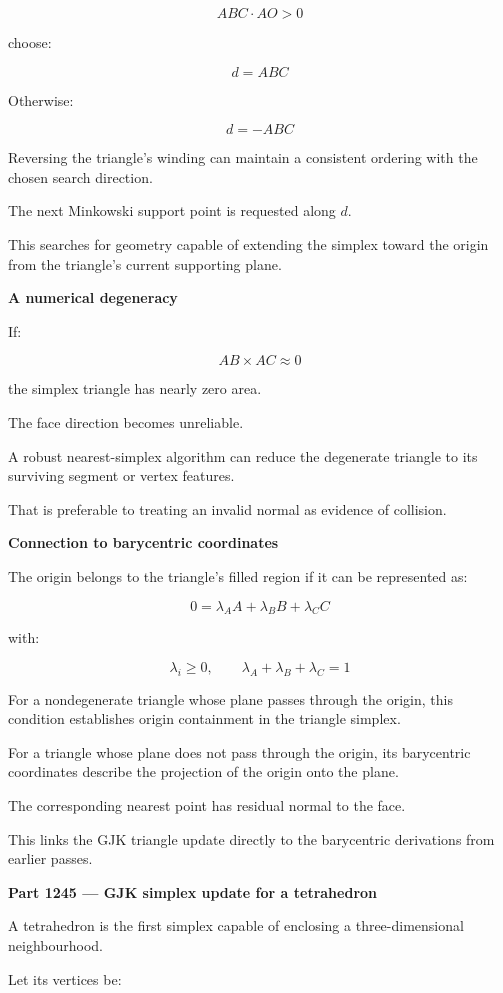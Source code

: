 \[
ABC\cdot AO>0
\]

choose:

\[
\boxed{d=ABC}
\]

Otherwise:

\[
\boxed{d=-ABC}
\]

Reversing the triangle's winding can maintain a consistent ordering with the chosen search direction.

The next Minkowski support point is requested along \(d\).

This searches for geometry capable of extending the simplex toward the origin from the triangle's current supporting plane.

\textbf{A numerical degeneracy}

If:

\[
AB\times AC\approx0
\]

the simplex triangle has nearly zero area.

The face direction becomes unreliable.

A robust nearest-simplex algorithm can reduce the degenerate triangle to its surviving segment or vertex features.

That is preferable to treating an invalid normal as evidence of collision.

\textbf{Connection to barycentric coordinates}

The origin belongs to the triangle's filled region if it can be represented as:

\[
0=\lambda_AA+\lambda_BB+\lambda_CC
\]

with:

\[
\lambda_i\ge0,\qquad \lambda_A+\lambda_B+\lambda_C=1
\]

For a nondegenerate triangle whose plane passes through the origin, this condition establishes origin containment in the triangle simplex.

For a triangle whose plane does not pass through the origin, its barycentric coordinates describe the projection of the origin onto the plane.

The corresponding nearest point has residual normal to the face.

This links the GJK triangle update directly to the barycentric derivations from earlier passes.

\textbf{Part 1245 --- GJK simplex update for a tetrahedron}

A tetrahedron is the first simplex capable of enclosing a three-dimensional neighbourhood.

Let its vertices be:

